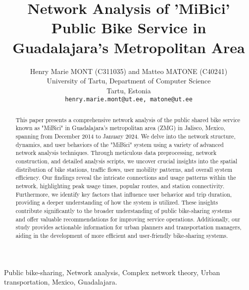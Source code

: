 \documentclass[conference]{IEEEtran}
\begin{document}
\title{\LARGE Network Analysis of 'MiBici' Public Bike Service in Guadalajara's Metropolitan Area}

\author{Henry Marie MONT (C311035) and Matteo MATONE (C40241) \\
University of Tartu, Department of Computer Science \\
Tartu, Estonia \\
\texttt{henry.marie.mont@ut.ee, matone@ut.ee}}

\maketitle

\begin{abstract}
This paper presents a comprehensive network analysis of the public shared bike service known as "MiBici" in Guadalajara's metropolitan area (ZMG) in Jalisco, Mexico, spanning from December 2014 to January 2024. We delve into the network structure, dynamics, and user behaviors of the "MiBici" system using a variety of advanced network analysis techniques. Through meticulous data preprocessing, network construction, and detailed analysis scripts, we uncover crucial insights into the spatial distribution of bike stations, traffic flows, user mobility patterns, and overall system efficiency. Our findings reveal the intricate connections and usage patterns within the network, highlighting peak usage times, popular routes, and station connectivity. Furthermore, we identify key factors that influence user behavior and trip duration, providing a deeper understanding of how the system is utilized. These insights contribute significantly to the broader understanding of public bike-sharing systems and offer valuable recommendations for improving service operations. Additionally, our study provides actionable information for urban planners and transportation managers, aiding in the development of more efficient and user-friendly bike-sharing systems. 
\end{abstract}

\IEEEoverridecommandlockouts

\begin{keywords}
Public bike-sharing, Network analysis, Complex network theory, Urban transportation, Mexico, Guadalajara.
\end{keywords}
\end{document}
